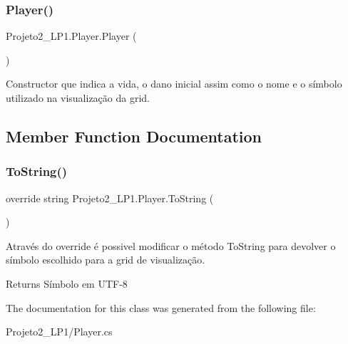 \subsubsection{\texorpdfstring{Player()}{Player()}}
{\footnotesize\ttfamily Projeto2\+\_\+\+L\+P1.\+Player.\+Player (\begin{DoxyParamCaption}{ }\end{DoxyParamCaption})\hspace{0.3cm}{\ttfamily [inline]}}



Constructor que indica a vida, o dano inicial assim como o nome e o símbolo utilizado na visualização da grid. 



\subsection{Member Function Documentation}
\mbox{\label{class_projeto2___l_p1_1_1_player_a3092133d59ed9886d2d47a661740f779}} 
\subsubsection{\texorpdfstring{To\+String()}{ToString()}}
{\footnotesize\ttfamily override string Projeto2\+\_\+\+L\+P1.\+Player.\+To\+String (\begin{DoxyParamCaption}{ }\end{DoxyParamCaption})\hspace{0.3cm}{\ttfamily [inline]}}



Através do override é possivel modificar o método To\+String para devolver o símbolo escolhido para a grid de visualização. 

\begin{DoxyReturn}{Returns}
Símbolo em U\+T\+F-\/8
\end{DoxyReturn}


The documentation for this class was generated from the following file\+:\begin{DoxyCompactItemize}
\item 
Projeto2\+\_\+\+L\+P1/Player.\+cs\end{DoxyCompactItemize}
